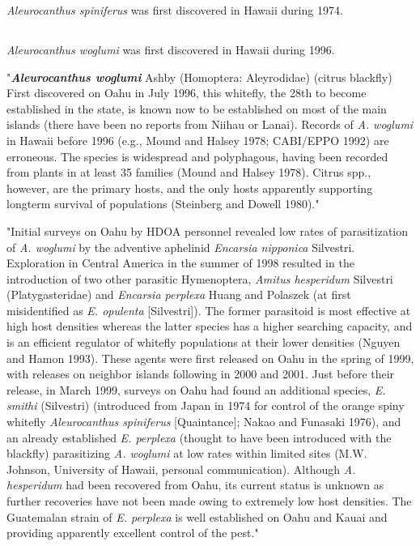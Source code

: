 \documentclass[]{scrartcl}
\begin{document}
\textit{Aleurocanthus spiniferus} was first discovered in Hawaii during 1974.


\subsection{}

\textit{Aleurocanthus woglumi} was first discovered in Hawaii during 1996.

"\textit{\textbf{Aleurocanthus woglumi}} Ashby (Homoptera: Aleyrodidae) (citrus blackfly) First discovered on Oahu in July 1996, this whitefly, the 28th to become established in the state, is known now to be established on most of the main islands (there have been no reports from Niihau or Lanai). Records of \textit{A. woglumi} in Hawaii before 1996 (e.g., Mound and Halsey 1978; CABI/EPPO 1992) are erroneous. The species is widespread and polyphagous, having been recorded from plants in at least 35 families (Mound and Halsey 1978). Citrus spp., however, are the primary hosts, and the only hosts apparently supporting longterm survival of populations (Steinberg and Dowell 1980)."

"Initial surveys on Oahu by HDOA personnel revealed low rates of parasitization of \textit{A. woglumi} by the adventive aphelinid \textit{Encarsia nipponica} Silvestri. Exploration in Central America in the summer of 1998 resulted in the introduction of two other parasitic Hymenoptera, \textit{Amitus hesperidum} Silvestri (Platygasteridae) and \textit{Encarsia perplexa} Huang and Polaszek (at first misidentified as \textit{E. opulenta} [Silvestri]). The former parasitoid is most effective at high host densities whereas the latter species has a higher searching capacity, and is an efficient regulator of whitefly populations at their lower densities (Nguyen and Hamon 1993). These agents were first released on Oahu in the spring of 1999, with releases on neighbor islands following in 2000 and 2001. Just before their release, in March 1999, surveys on Oahu had found an additional species, \textit{E. smithi} (Silvestri) (introduced from Japan in 1974 for control of the orange spiny whitefly \textit{Aleurocanthus spiniferus} [Quaintance]; Nakao and Funasaki 1976), and an already established \textit{E. perplexa} (thought to have been introduced with the blackfly) parasitizing \textit{A. woglumi} at low rates within limited sites (M.W. Johnson, University of Hawaii, personal communication). Although \textit{A. hesperidum} had been recovered from Oahu, its current status is unknown as further recoveries have not been made owing to extremely low host densities. The Guatemalan strain of \textit{E. perplexa} is well established on Oahu and Kauai and providing apparently excellent control of the pest."
\end{document}
